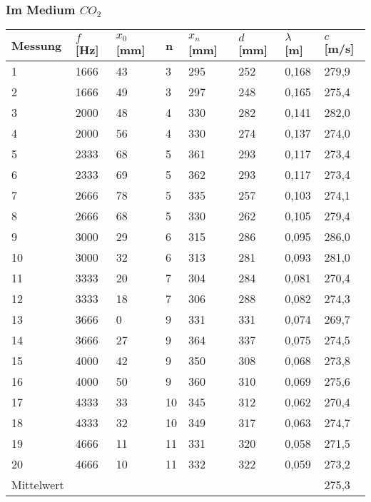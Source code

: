 \documentclass{scrartcl}
\begin{document}
\newpage
\subsubsection{Im Medium $CO_{2}$}
\begin{table}[h!]
\begin{tabular}{l|l|l|l|l|l|l|l}
Messung & $f$ {[}Hz{]} & $x_{0}$ [mm] & n & $x_{n}$ [mm] & $d$ [mm]   & $\lambda$ [m]      & $c$ [m/s]      \\
\hline
1       & 1666       & 43                & 3 & 295               & 252 & 0,168 & 279,9 \\
2       & 1666       & 49                & 3 & 297               & 248 & 0,165 & 275,4 \\
3       & 2000       & 48                & 4 & 330               & 282 & 0,141 & 282,0 \\
4       & 2000       & 56                & 4 & 330               & 274 & 0,137 & 274,0 \\
5       & 2333       & 68                & 5 & 361               & 293 & 0,117 & 273,4 \\
6       & 2333       & 69                & 5 & 362               & 293 & 0,117 & 273,4 \\
7       & 2666       & 78                & 5 & 335               & 257 & 0,103 & 274,1 \\
8       & 2666       & 68                & 5 & 330               & 262 & 0,105 & 279,4 \\
9       & 3000       & 29                & 6 & 315               & 286 & 0,095 & 286,0 \\
10      & 3000       & 32                & 6 & 313               & 281 & 0,093 & 281,0 \\
11      & 3333       & 20                & 7 & 304               & 284 & 0,081 & 270,4 \\
12      & 3333       & 18                & 7 & 306               & 288 & 0,082 & 274,3 \\
13      & 3666       &  0                & 9 & 331               & 331 & 0,074 & 269,7 \\
14      & 3666       & 27                & 9 & 364               & 337 & 0,075 & 274,5 \\
15      & 4000       & 42                & 9 & 350               & 308 & 0,068 & 273,8 \\
16      & 4000       & 50                & 9 & 360               & 310 & 0,069 & 275,6 \\
17      & 4333       & 33                & 10 & 345               & 312 & 0,062 & 270,4 \\
18      & 4333       & 32                & 10 & 349               & 317 & 0,063 & 274,7 \\
19      & 4666       & 11                & 11 & 331               & 320 & 0,058 & 271,5 \\
20      & 4666       & 10                & 11 & 332               & 322 & 0,059 & 273,2 \\
\hline
Mittelwert & & & & & & & 275,3
\end{tabular}
\end{table}
\end{document}
